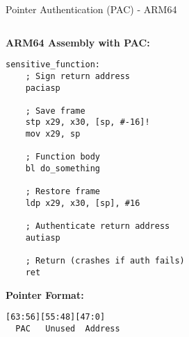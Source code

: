 \documentclass[aspectratio=169,12pt]{beamer}
\begin{document}
\begin{frame}[fragile]{Pointer Authentication (PAC) - ARM64}
\begin{columns}
\begin{column}{0.5\textwidth}
            \begin{tcolorbox}[colback=green!10]
                \small
                \textbf{ARM64 Assembly with PAC:}
                \begin{verbatim}
sensitive_function:
    ; Sign return address
    paciasp
    
    ; Save frame
    stp x29, x30, [sp, #-16]!
    mov x29, sp
    
    ; Function body
    bl do_something
    
    ; Restore frame
    ldp x29, x30, [sp], #16
    
    ; Authenticate return address
    autiasp
    
    ; Return (crashes if auth fails)
    ret
                \end{verbatim}
            \end{tcolorbox}
            
            \begin{tcolorbox}[colback=yellow!10]
                \small
                \textbf{Pointer Format:}
                \begin{verbatim}
[63:56][55:48][47:0]
  PAC   Unused  Address
                \end{verbatim}
            \end{tcolorbox}
        \end{column}
    \end{columns}
\end{frame}
\end{document}

